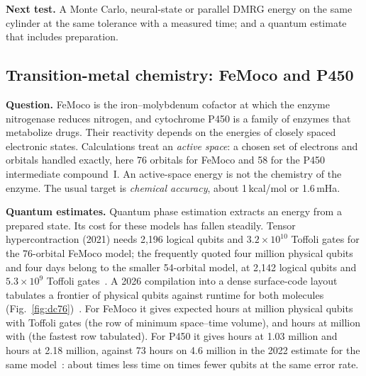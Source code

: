\documentclass[10pt,a4paper]{article}
\begin{document}
\textbf{Next test.} A Monte Carlo, neural-state or parallel DMRG energy on the same cylinder at the same tolerance with a measured time; and a quantum estimate that includes preparation.

\subsection{Transition-metal chemistry: FeMoco and P450}
\label{sec:chem}

\textbf{Question.} FeMoco is the iron--molybdenum cofactor at which the enzyme nitrogenase reduces nitrogen, and cytochrome P450 is a family of enzymes that metabolize drugs. Their reactivity depends on the energies of closely spaced electronic states. Calculations treat an \emph{active space}: a chosen set of electrons and orbitals handled exactly, here 76 orbitals for FeMoco and 58 for the P450 intermediate compound~I. An active-space energy is not the chemistry of the enzyme. The usual target is \emph{chemical accuracy}, about 1\,kcal/mol or 1.6\,mHa.

\textbf{Quantum estimates.} Quantum phase estimation extracts an energy from a prepared state. Its cost for these models has fallen steadily. Tensor hypercontraction (2021) needs 2{,}196 logical qubits and $3.2\times10^{10}$ Toffoli gates for the 76-orbital FeMoco model; the frequently quoted four million physical qubits and four days belong to the smaller 54-orbital model, at 2{,}142 logical qubits and $5.3\times10^9$ Toffoli gates~\cite{lee2021thc}. A 2026 compilation into a dense surface-code layout tabulates a frontier of physical qubits against runtime for both molecules (Fig.~\ref{fig:dc76})~\cite{low2026dense}. For FeMoco it gives \femoT{} expected hours at \femoSevMinvolQ{} million physical qubits with \femoTofMinvol{} Toffoli gates (the row of minimum space--time volume), and \femoFastT{} hours at \femoSevFastQ{} million with \femoTofFast{} (the fastest row tabulated). For P450 it gives \pfMinvolH{} hours at 1.03 million and \pfFastH{} hours at 2.18 million, against 73 hours on 4.6 million in the 2022 estimate for the same model~\cite{goings2022}: about \pfSpeed{} times less time on \pfQubits{} times fewer qubits at the same error rate.
\end{document}
